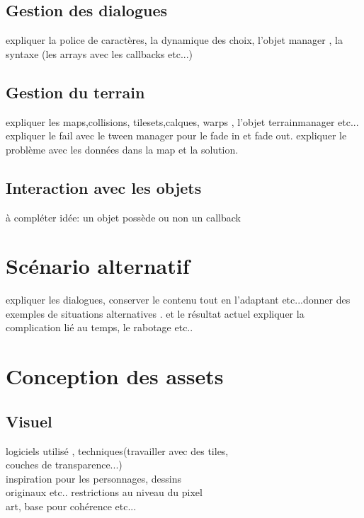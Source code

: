\documentclass[11pt]{article}
\begin{document}
\subsection{Gestion des dialogues}
expliquer la police de caractères, la dynamique des choix, l'objet manager , la syntaxe (les arrays avec les callbacks etc...)
\subsection{Gestion du terrain}
expliquer les maps,collisions, tilesets,calques, warps , l'objet terrainmanager etc... expliquer le fail avec le tween manager pour le fade in et fade out.
expliquer le problème avec les données dans la map et la solution.
\subsection{Interaction avec les objets}
à compléter idée: un objet possède ou non un callback 


\section{Scénario alternatif}
expliquer les dialogues, conserver le contenu tout en l'adaptant etc...donner des exemples de situations alternatives . et le résultat actuel
expliquer la complication lié au temps, le rabotage etc..
\section{Conception des assets}
\subsection{Visuel}
logiciels utilisé , techniques(travailler avec des tiles, \\ couches de transparence...)\\ inspiration pour les personnages, dessins\\ originaux etc.. restrictions au niveau du pixel\\ art, base pour cohérence etc...
\end{document}
